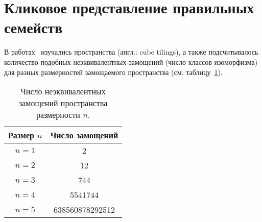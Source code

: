 


\section{Кликовое представление правильных семейств}
\label{sec:clique}

    В работах~\cite{sikiric2007cube, mathew2013enumerating} изучались  пространства (англ.: cube tilings), а также подсчитывалось количество подобных неэквивалентных замощений (число классов изоморфизма) для разных размерностей замощаемого пространства (см. таблицу~\ref{tab:counttilings}).
    \begin{table}[h]
        \centering
        \captionsetup{justification=centering} %
        \caption{\label{tab:counttilings} Число неэквивалентных замощений пространства размерности $n$.}
        \begin{tabular}{|c|c|}
            \toprule
            Размер $n$  & Число замощений \\
            \midrule
            $n = 1$ & 2 \\
            \midrule
            $n = 2$ & 12 \\
            \midrule
            $n = 3$ & 744 \\
            \midrule
            $n = 4$ & 5541744 \\
            \midrule
            $n = 5$ & 638560878292512 \\
            \bottomrule
        \end{tabular}
    \end{table}
    

